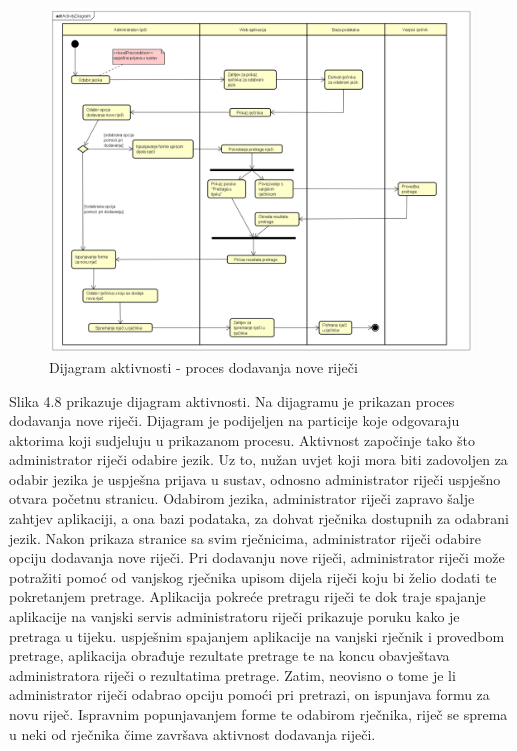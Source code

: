 			
			
			\begin{figure}[H]
				\includegraphics[width=\textwidth]{slike/ActivityDiagram.PNG}
				\caption{Dijagram aktivnosti - proces dodavanja nove riječi}
				\label{fig:activityDiagram}
			\end{figure}
			
			\newpage
			
			Slika 4.8 prikazuje dijagram aktivnosti. Na dijagramu je prikazan proces dodavanja nove riječi. Dijagram je podijeljen na particije koje odgovaraju aktorima koji sudjeluju u prikazanom procesu. Aktivnost započinje tako što administrator riječi odabire jezik. Uz to, nužan uvjet koji mora biti zadovoljen za odabir jezika je uspješna prijava u sustav, odnosno administrator riječi uspješno otvara početnu stranicu. Odabirom jezika, administrator riječi zapravo šalje zahtjev aplikaciji, a ona bazi podataka, za dohvat rječnika dostupnih za odabrani jezik. Nakon prikaza stranice sa svim rječnicima, administrator riječi odabire opciju dodavanja nove riječi. Pri dodavanju nove riječi, administrator riječi može potražiti pomoć od vanjskog rječnika upisom dijela riječi koju bi želio dodati te pokretanjem pretrage. Aplikacija pokreće pretragu riječi te dok traje spajanje aplikacije na vanjski servis administratoru riječi prikazuje poruku kako je pretraga u tijeku. uspješnim spajanjem aplikacije na vanjski rječnik i provedbom pretrage, aplikacija obrađuje rezultate pretrage te na koncu obavještava administratora riječi o rezultatima pretrage. Zatim, neovisno o tome je li administrator riječi odabrao opciju pomoći pri pretrazi, on ispunjava formu za novu riječ. Ispravnim popunjavanjem forme te odabirom rječnika, riječ se sprema u neki od rječnika čime završava aktivnost dodavanja riječi.
			
